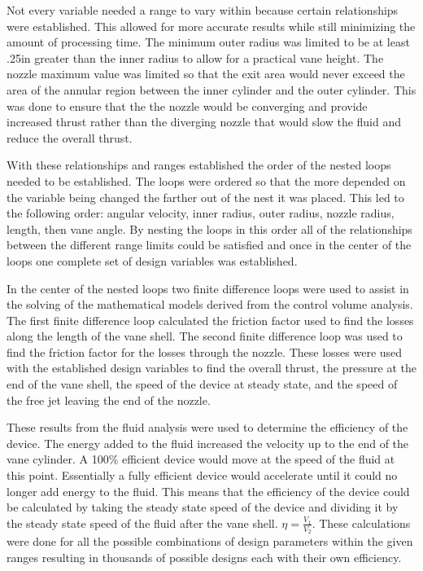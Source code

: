 \documentclass{report}
\begin{document}
Not every variable needed a range to vary within because certain relationships were established. This allowed for more accurate results while still minimizing the amount of processing time. The minimum outer radius was limited to be at least .25in greater than the inner radius to allow for a practical vane height. The nozzle maximum value was limited so that the exit area would never exceed the area of the annular region between the inner cylinder and the outer cylinder. This was done to ensure that the the nozzle would be converging and provide increased thrust rather than the diverging nozzle that would slow the fluid and reduce the overall thrust.  \par
With these relationships and ranges established the order of the nested loops needed to be established. The loops were ordered so that the more depended on the variable being changed the farther out of the nest it was placed. This led to the following order: angular velocity, inner radius, outer radius, nozzle radius, length, then vane angle. By nesting the loops in this order all of the relationships between the different range limits could be satisfied and once in the center of the loops one complete set of design variables was established.\par
In the center of the nested loops two finite difference loops were used to assist in the solving of the mathematical models derived from the control volume analysis. The first finite difference loop calculated the friction factor used to find the losses along the length of the vane shell. The second finite difference loop was used to find the friction factor for the losses through the nozzle. These losses were used with the established design variables to find the overall thrust, the pressure at the end of the vane shell, the speed of the device at steady state, and the speed of the free jet leaving the end of the nozzle.\par
These results from the fluid analysis were used to determine the efficiency of the device. The energy added to the fluid increased the velocity up to the end of the vane cylinder. A 100\% efficient device would move at the speed of the fluid at this point. Essentially a fully efficient device would accelerate until it could no longer add energy to the fluid. This means that the efficiency of the device could be calculated by taking the steady state speed of the device and dividing it by the steady state speed of the fluid after the vane shell. $\eta=\frac{V_1}{V_2}$. These calculations were done for all the possible combinations of design parameters within the given ranges resulting in thousands of possible designs each with their own efficiency.\par
\end{document}
